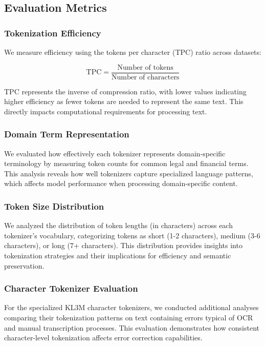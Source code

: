 \subsection{Evaluation Metrics}

\subsubsection{Tokenization Efficiency}

We measure efficiency using the tokens per character (TPC) ratio across datasets:

\begin{equation}
\text{TPC} = \frac{\text{Number of tokens}}{\text{Number of characters}}
\end{equation}

TPC represents the inverse of compression ratio, with lower values indicating higher efficiency as fewer tokens are needed to represent the same text. This directly impacts computational requirements for processing text.

\subsubsection{Domain Term Representation}

We evaluated how effectively each tokenizer represents domain-specific terminology by measuring token counts for common legal and financial terms. This analysis reveals how well tokenizers capture specialized language patterns, which affects model performance when processing domain-specific content.

\subsubsection{Token Size Distribution}

We analyzed the distribution of token lengths (in characters) across each tokenizer's vocabulary, categorizing tokens as short (1-2 characters), medium (3-6 characters), or long (7+ characters). This distribution provides insights into tokenization strategies and their implications for efficiency and semantic preservation.

\subsubsection{Character Tokenizer Evaluation}

For the specialized KL3M character tokenizers, we conducted additional analyses comparing their tokenization patterns on text containing errors typical of OCR and manual transcription processes. This evaluation demonstrates how consistent character-level tokenization affects error correction capabilities.